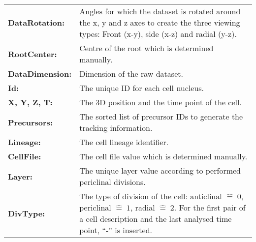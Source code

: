 \documentclass[11pt,a4paper, final]{article}
\begin{document}
\noindent
\begin{tabularx}{\textwidth}{@{} >{\RaggedRight}p{2.8cm} X @{}}
\textbf{DataRotation:} &
Angles for which the dataset is rotated around the x, y and z axes to create the three viewing types: Front (x-y), side (x-z) and radial (y-z).\\
\textbf{RootCenter:} &
Centre of the root which is determined manually.\\
\textbf{DataDimension:} &
Dimension of the raw dataset.\\
\textbf{Id:} &
The unique ID for each cell nucleus.\\
\textbf{X, Y, Z, T:} &
The 3D position and the time point of the cell.\\
\textbf{Precursors:} &
The sorted list of precursor IDs to generate the tracking information.\\
\textbf{Lineage:} &
The cell lineage identifier.\\
\textbf{CellFile:} &
The cell file value which is determined manually.\\
\textbf{Layer:} &
The unique layer value according to performed periclinal divisions.\\
\textbf{DivType:} &
The type of division of the cell: anticlinal $\widehat{=} \; 0$, periclinal $\widehat{=} \; 1$, radial $\widehat{=} \; 2$. For the first pair of a cell description and the last analysed time point, ``-'' is inserted.\\
\end{tabularx}

\clearpage



\end{document}
